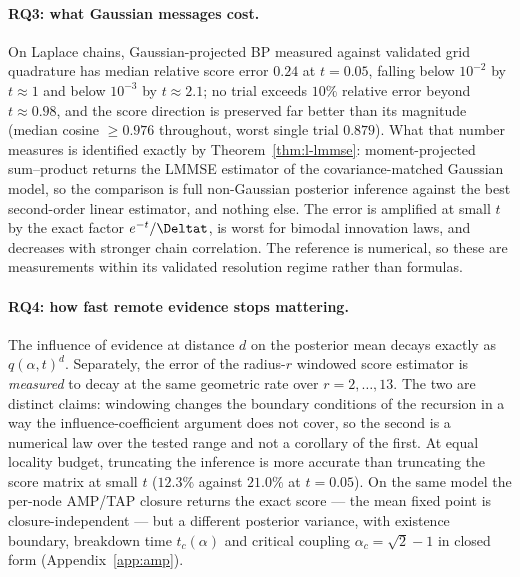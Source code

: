\paragraph{RQ3: what Gaussian messages cost.} On Laplace
chains, Gaussian-projected BP measured against validated grid quadrature has
median relative score error $0.24$ at $t = 0.05$, falling below $10^{-2}$ by
$t \approx 1$ and below $10^{-3}$ by $t \approx 2.1$; no trial exceeds $10\%$
relative error beyond $t \approx 0.98$, and the score direction is preserved far
better than its magnitude (median cosine $\geq 0.976$ throughout, worst single
trial $0.879$). What that number measures is identified exactly by
Theorem~\ref{thm:l-lmmse}: moment-projected sum--product returns the LMMSE
estimator of the covariance-matched Gaussian model, so the comparison is full
non-Gaussian posterior inference against the best second-order linear
estimator, and nothing else. The error is amplified at small $t$ by the exact
factor $e^{-t}/\Deltat$, is worst for bimodal innovation laws, and decreases
with stronger chain correlation. The reference is numerical, so these are
measurements within its validated resolution regime rather than formulas.

\paragraph{RQ4: how fast remote evidence stops mattering.} The influence of
evidence at distance $d$ on the posterior mean decays exactly as
$q(\alpha,t)^d$. Separately, the error of the radius-$r$ windowed score
estimator is \emph{measured} to decay at the same geometric rate over
$r = 2,\dots,13$. The two are distinct claims: windowing changes the boundary
conditions of the recursion in a way the influence-coefficient argument does not
cover, so the second is a numerical law over the tested range and not a
corollary of the first. At equal locality budget, truncating the inference is
more accurate than truncating the score matrix at small $t$ ($12.3\%$ against
$21.0\%$ at $t = 0.05$). On the same model the per-node AMP/TAP closure returns
the exact score --- the mean fixed point is closure-independent --- but a
different posterior variance, with existence boundary, breakdown time
$t_c(\alpha)$ and critical coupling $\alpha_c = \sqrt{2}-1$ in closed form
(Appendix~\ref{app:amp}).\label{sec:conclusions-amp}

